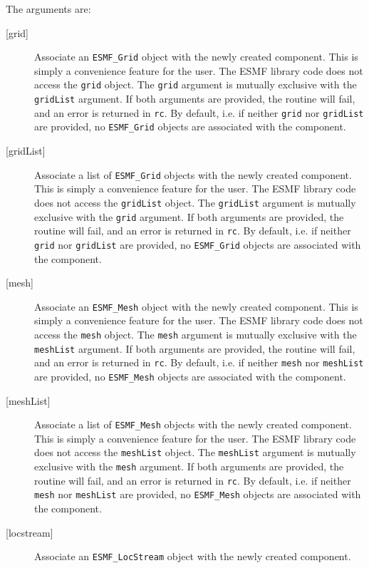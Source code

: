    The arguments are:
   \begin{description}
   \item[{[grid]}]
     Associate an {\tt ESMF\_Grid} object with the newly created component.
     This is simply a convenience feature for the user. The ESMF library code
     does not access the {\tt grid} object.
     The {\tt grid} argument is mutually exclusive with the {\tt gridList}
     argument. If both arguments are provided, the routine will fail, and an
     error is returned in {\tt rc}.
     By default, i.e. if neither {\tt grid} nor {\tt gridList} are provided,
     no {\tt ESMF\_Grid} objects are associated with the component.
   \item[{[gridList]}]
     Associate a list of {\tt ESMF\_Grid} objects with the newly created
     component.
     This is simply a convenience feature for the user. The ESMF library code
     does not access the {\tt gridList} object.
     The {\tt gridList} argument is mutually exclusive with the {\tt grid}
     argument. If both arguments are provided, the routine will fail, and an
     error is returned in {\tt rc}.
     By default, i.e. if neither {\tt grid} nor {\tt gridList} are provided,
     no {\tt ESMF\_Grid} objects are associated with the component.
   \item[{[mesh]}]
     Associate an {\tt ESMF\_Mesh} object with the newly created component.
     This is simply a convenience feature for the user. The ESMF library code
     does not access the {\tt mesh} object.
     The {\tt mesh} argument is mutually exclusive with the {\tt meshList}
     argument. If both arguments are provided, the routine will fail, and an
     error is returned in {\tt rc}.
     By default, i.e. if neither {\tt mesh} nor {\tt meshList} are provided,
     no {\tt ESMF\_Mesh} objects are associated with the component.
   \item[{[meshList]}]
     Associate a list of {\tt ESMF\_Mesh} objects with the newly created
     component.
     This is simply a convenience feature for the user. The ESMF library code
     does not access the {\tt meshList} object.
     The {\tt meshList} argument is mutually exclusive with the {\tt mesh}
     argument. If both arguments are provided, the routine will fail, and an
     error is returned in {\tt rc}.
     By default, i.e. if neither {\tt mesh} nor {\tt meshList} are provided,
     no {\tt ESMF\_Mesh} objects are associated with the component.
   \item[{[locstream]}]
     Associate an {\tt ESMF\_LocStream} object with the newly created component.

\end{description}
